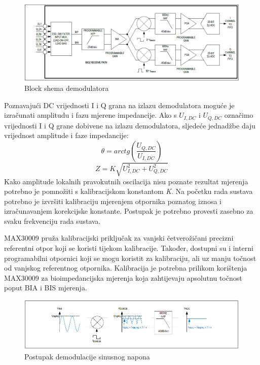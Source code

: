 \documentclass[../diplomski_rad.tex]{subfiles}
\begin{document}
\begin{figure}[htb]
    \centering
    \includegraphics[width=1\textwidth]{Figures/max30009_receive.png} 
    \caption{Block shema demodulatora \cite{max30009_datasheet}}
    \label{slk:max30009_receive}
\end{figure}

Poznavajući DC vrijednosti I i Q grana na izlazu demodulatora moguće je izračunati amplitudu i fazu mjerene impedancije.
Ako s $U_{I,DC}$ i $U_{Q,DC}$ označimo vrijednosti I i Q grane dobivene na izlazu demodulatora, 
sljedeće jednadžbe daju vrijednost amplitude i faze impedancije:
\begin{equation}
    \label{jed:cpe}
    \theta = arctg(\frac{U_{Q,DC}}{U_{I,DC}})
\end{equation} 
\begin{equation}
    \label{jed:cpe}
    Z = K\sqrt{U_{I,DC}^2+U_{Q,DC}^2}
\end{equation} 
Kako amplitude lokalnih pravokutnih oscilacija nisu poznate rezultat mjerenja potrebno je pomnožiti s kalibracijskom 
konstantom \textit{K}. Na početku rada sustava potrebno je izvršiti kalibraciju mjerenjem otpornika poznatog iznosa i 
izračunavanjem korekcijske konstante. Postupak je potrebno provesti zasebno za svaku frekvenciju rada sustava.

MAX30009 pruža kalibracijski priključak za vanjski četverožičani precizni referentni otpor koji se koristi tijekom kalibracije. 
Također, dostupni su i interni programabilni otpornici koji se mogu koristit za kalibraciju, ali uz manju točnost od vanjskog referentnog otpornika.
Kalibracija je potrebna prilikom korištenja MAX30009 za bioimpedancijska mjerenja koja zahtijevaju apsolutnu točnost poput BIA i BIS mjerenja.

\begin{figure}[htb]
    \centering
    \includegraphics[width=1\textwidth]{Figures/max30009_demodulator.png} 
    \caption{Postupak demodulacije sinusnog napona \cite{max30009_datasheet}}
    \label{slk:max30009_demodulator}
\end{figure}
\end{document}
